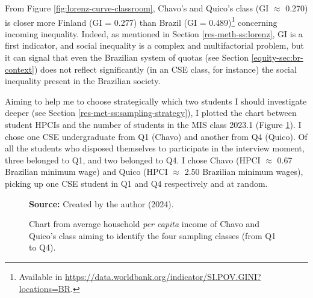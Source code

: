 From Figure \ref{fig:lorenz-curve-classroom}, Chavo's and Quico's class (\gls{GI} $\approx$ 0.270) is closer more Finland (\gls{GI} = 0.277) than Brazil (\gls{GI} = 0.489)\footnote{Available in \url{https://data.worldbank.org/indicator/SI.POV.GINI?locations=BR}.} concerning incoming inequality. Indeed, as mentioned in Section \ref{res-meth-ss:lorenz}, \gls{GI} is a first indicator, and social inequality is a complex and multifactorial problem, but it can signal that even the Brazilian system of quotas (see Section \ref{equity-sec:br-context}) does not reflect significantly (in an \gls{CSE} class, for instance) the social inequality present in the Brazilian society.

Aiming to help me to choose strategically which two students I should investigate deeper (see Section \ref{res-met-ss:sampling-strategy}), I plotted the chart between student \gls{HPCI}s and the number of students in the \gls{MIS} class 2023.1 (Figure \ref{fig:sampling-classes-ds-sef}). I chose one \gls{CSE} undergraduate from \gls{Q}1 (Chavo) and another from \gls{Q}4 (Quico). Of all the students who disposed themselves to participate in the interview moment, three belonged to \gls{Q}1, and two belonged to \gls{Q}4. I chose Chavo (\gls{HPCI} $\approx$ 0.67 Brazilian minimum wage) and Quico (\gls{HPCI} $\approx$ 2.50 Brazilian minimum wages), picking up one \gls{CSE} student in \gls{Q}1 and \gls{Q}4 respectively and at random.

\begin{figure}[ht!]
\centering

\caption{\textmd{Chart from average household \textit{per capita} income of Chavo and Quico’s class aiming to identify the four sampling classes (from \acrshort{Q}1 to \acrshort{Q}4).}}
\label{fig:sampling-classes-ds-sef}

\par\medskip\ABNTEXfontereduzida\selectfont\textbf{Source:} Created by the author (2024).%
\end{figure}

